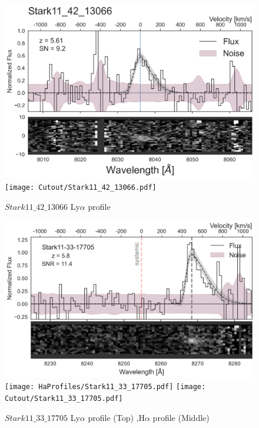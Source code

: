 \documentclass[12pt,english]{article}
\begin{document}
\begin{figure}
\begin{center}\includegraphics[width=12cm, trim=0.1cm 0cm 0cm -1cm]{LyaProfiles/Stark11_42_13066.png}
\texttt{[image: Cutout/Stark11\_42\_13066.pdf]}
\caption{$Stark11\_42\_13066$ Ly$\alpha$ profile}
\end{center}
\end{figure}
\clearpage
\begin{figure}
\begin{center}\includegraphics[width=12cm, trim=0.1cm 0cm 0cm -1cm]{LyaProfiles/Stark11_33_17705.png}
\texttt{[image: HaProfiles/Stark11\_33\_17705.pdf]}
\texttt{[image: Cutout/Stark11\_33\_17705.pdf]}
\caption{$Stark11\_33\_17705$ Ly$\alpha$ profile (Top) ,H$\alpha$ profile (Middle)}
\end{center}
\end{figure}
\clearpage
\end{document}
